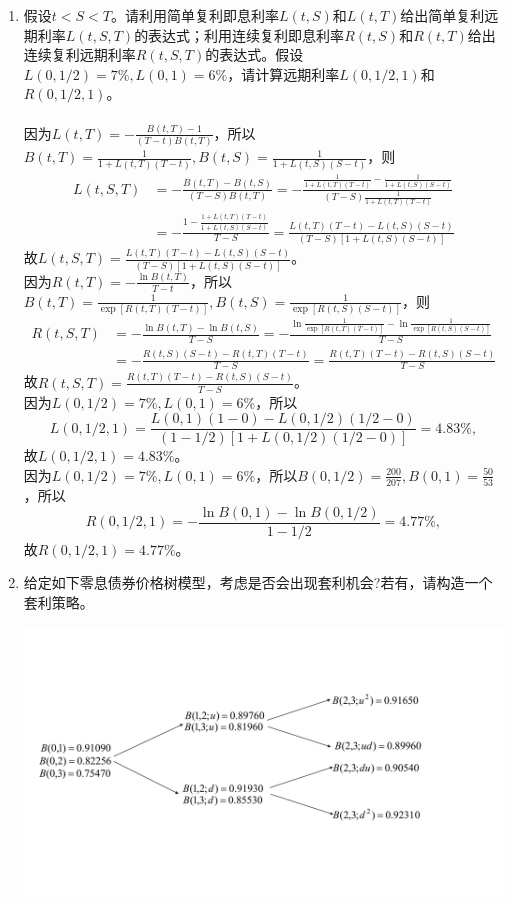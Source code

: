 \begin{enumerate}
    \item 假设$t<S<T$。请利用简单复利即息利率$L(t,S)$和$L(t,T)$给出简单复利远期利率$L(t,S,T)$的表达式；利用连续复利即息利率$R(t,S)$和$R(t,T)$给出连续复利远期利率$R(t,S,T)$的表达式。假设$L(0,1/2)=7\%,L(0,1)=6\%$，请计算远期利率$L(0,1/2,1)$和$R(0,1/2,1)$。\\
    \sol\\
    因为$\displaystyle L(t, T) = -\frac{B(t,T) - 1}{(T - t)B(t, T)}$，所以$\displaystyle B(t, T) = \frac{1}{1 + L(t, T)(T - t)}, B(t, S) = \frac{1}{1 + L(t, S)(S - t)}$，则
    \begin{align*}
        L(t,S,T) & = -\frac{B(t,T)-B(t,S)}{(T-S)B(t,T)} = -\frac{\frac{1}{1 + L(t, T)(T - t)} - \frac{1}{1 + L(t, S)(S - t)}}{(T-S)\frac{1}{1 + L(t, T)(T - t)}} \\
        & = - \frac{1 - \frac{1 + L(t, T)(T - t)}{1 + L(t, S)(S - t)}}{T-S} = \frac{L(t, T)(T - t) - L(t, S)(S - t)}{(T-S)[1 + L(t, S)(S - t)]}
    \end{align*}
    故$\displaystyle L(t,S,T) = \frac{L(t, T)(T - t) - L(t, S)(S - t)}{(T-S)[1 + L(t, S)(S - t)]}$。\\
    因为$\displaystyle R(t, T) = -\frac{\ln B(t, T)}{T - t}$，所以$\displaystyle B(t, T) = \frac{1}{\exp\left[R(t, T)(T - t)\right]}, B(t, S) = \frac{1}{\exp\left[R(t, S)(S - t)\right]}$，则
    \begin{align*}
        R(t, S, T) & = -\frac{\ln B(t,T) - \ln B(t,S)}{T-S} = -\frac{\ln \frac{1}{\exp\left[R(t, T)(T - t)\right]} - \ln \frac{1}{\exp\left[R(t, S)(S - t)\right]}}{T-S}\\
        & = -\frac{R(t, S)(S - t) - R(t, T)(T - t)}{T-S} = \frac{R(t, T)(T - t) - R(t, S)(S - t)}{T-S}
    \end{align*}
    故$\displaystyle R(t, S, T) = \frac{R(t, T)(T - t) - R(t, S)(S - t)}{T-S}$。\\
    因为$L(0,1/2)=7\%,L(0,1)=6\%$，所以
    \[L(0,1/2,1) = \frac{L(0, 1)(1 - 0) - L(0, 1/2)(1/2 - 0)}{(1-1/2)[1 + L(0, 1/2)(1/2 - 0)]} = 4.83\%,\]
    故$L(0,1/2,1) = 4.83\%$。\\
    因为$L(0,1/2)=7\%,L(0,1)=6\%$，所以$\displaystyle B(0,1/2) = \frac{200}{207}, B(0, 1) = \frac{50}{53}$，所以
    \[R(0, 1/2, 1) = -\frac{\ln B(0,1) - \ln B(0,1/2)}{1-1/2} = 4.77\%,\]
    故$R(0,1/2,1) = 4.77\%$。
    \item 给定如下零息债券价格树模型，考虑是否会出现套利机会?若有，请构造一个套利策略。
    \begin{center}
        \includegraphics[scale=0.5]{8-7.pdf}

\end{center}
\end{enumerate}
